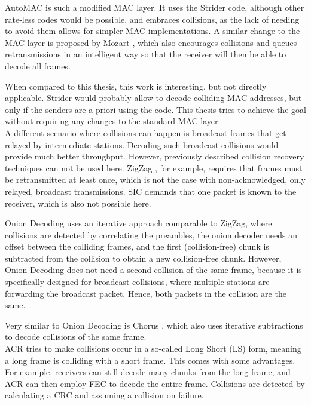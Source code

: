 AutoMAC \cite{gudipati2012} is such a modified \gls{MAC} layer. It uses the Strider code, although other rate-less codes would be possible, and embraces collisions, as the lack of needing to avoid them allows for simpler \gls{MAC} implementations. A similar change to the \gls{MAC} layer is proposed by Mozart \cite{bansal2013}, which also encourages collisions and queues retransmissions in an intelligent way so that the receiver will then be able to decode all frames.

When compared to this thesis, this work is interesting, but not directly applicable. Strider would probably allow to decode colliding \gls{MAC} addresses, but only if the senders are a-priori using the code. This thesis tries to achieve the goal without requiring any changes to the standard \gls{MAC} layer.\\

A different scenario where collisions can happen is broadcast frames that get relayed by intermediate stations. Decoding  such broadcast collisions would provide much better throughput. However, previously described collision recovery techniques can not be used here. ZigZag \cite{gollakota2008}, for example, requires that frames must be retransmitted at least once, which is not the case with non-acknowledged, only relayed, broadcast transmissions. \gls{SIC} \cite{patel1994} demands that one packet is known to the receiver, which is also not possible here.

Onion Decoding \cite{wang2010} uses an iterative approach  comparable to ZigZag, where collisions are detected by correlating the preambles, the onion decoder needs an offset between the colliding frames, and the first (collision-free) chunk is subtracted from the collision to obtain a new collision-free chunk. However, Onion Decoding does not need a second collision of the same frame, because it is specifically designed for broadcast collisions, where multiple stations are forwarding the broadcast packet. Hence, both packets in the collision are the same.

Very similar to Onion Decoding is Chorus \cite{zhang2010}, which also uses iterative subtractions to decode collisions of the same frame.\\

\gls{ACR} \cite{wu2010} tries to make collisions occur in a so-called Long Short (LS) form, meaning a long frame is colliding with a short frame. This comes with some advantages. For example. receivers can still decode many chunks from the long frame, and \gls{ACR} can then employ \gls{FEC} to decode the entire frame. Collisions are detected by calculating a \gls{CRC} and assuming a collision on failure.

